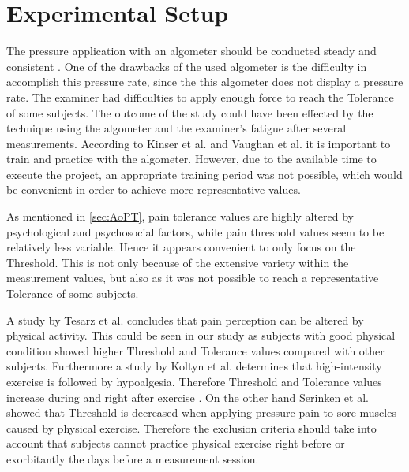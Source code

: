 \section{Experimental Setup}
The pressure application with an algometer should be conducted steady and consistent \cite{Fischer1987, Kinser2009}. One of the drawbacks of the used algometer is the difficulty in accomplish this pressure rate, since the this algometer does not display a pressure rate.
The examiner had difficulties to apply enough force to reach the Tolerance of some subjects. The outcome of the study could have been effected by the technique using the algometer and the examiner's fatigue after several measurements.  According to Kinser et al. \cite{Kinser2009} and Vaughan et al. \cite{Vaughan2007} it is important to train and practice with the algometer. However, due to the available time to execute the project, an appropriate training period was not possible, which would be convenient in order to achieve more representative values.

As mentioned in \autoref{sec:AoPT}, pain tolerance values are highly altered by psychological and psychosocial factors, while pain threshold values seem to be relatively less variable. Hence  it appears convenient to only focus on the Threshold.  This is not only because of the extensive variety within the measurement values, but also as it was not possible to reach a representative Tolerance of some subjects.

A study by Tesarz et al. \cite{Tesarz2012} concludes that pain perception can be altered by physical activity. This could be seen in our study as subjects with good physical condition showed higher Threshold and Tolerance values compared with other subjects. 
Furthermore a study by Koltyn et al. \cite{Koltyn2002} determines that high-intensity exercise is followed by hypoalgesia. Therefore Threshold and Tolerance values increase during and right after exercise  \cite{Koltyn2002}. On the other hand Serinken et al. \cite{Serinken2013} showed that Threshold is decreased when applying pressure pain to sore muscles caused by physical exercise. Therefore the exclusion criteria should take into account that subjects cannot practice physical exercise right before or exorbitantly the days before a measurement session.


